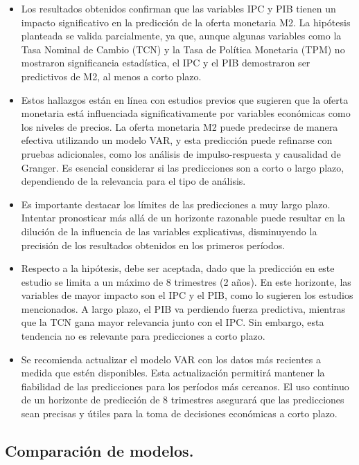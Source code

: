 \documentclass[
  12pt,
]{article}
\begin{document}
\begin{itemize}
\item
  Los resultados obtenidos confirman que las variables IPC y PIB tienen
  un impacto significativo en la predicción de la oferta monetaria M2.
  La hipótesis planteada se valida parcialmente, ya que, aunque algunas
  variables como la Tasa Nominal de Cambio (TCN) y la Tasa de Política
  Monetaria (TPM) no mostraron significancia estadística, el IPC y el
  PIB demostraron ser predictivos de M2, al menos a corto plazo.
\item
  Estos hallazgos están en línea con estudios previos que sugieren que
  la oferta monetaria está influenciada significativamente por variables
  económicas como los niveles de precios. La oferta monetaria M2 puede
  predecirse de manera efectiva utilizando un modelo VAR, y esta
  predicción puede refinarse con pruebas adicionales, como los análisis
  de impulso-respuesta y causalidad de Granger. Es esencial considerar
  si las predicciones son a corto o largo plazo, dependiendo de la
  relevancia para el tipo de análisis.
\item
  Es importante destacar los límites de las predicciones a muy largo
  plazo. Intentar pronosticar más allá de un horizonte razonable puede
  resultar en la dilución de la influencia de las variables
  explicativas, disminuyendo la precisión de los resultados obtenidos en
  los primeros períodos.
\item
  Respecto a la hipótesis, debe ser aceptada, dado que la predicción en
  este estudio se limita a un máximo de 8 trimestres (2 años). En este
  horizonte, las variables de mayor impacto son el IPC y el PIB, como lo
  sugieren los estudios mencionados. A largo plazo, el PIB va perdiendo
  fuerza predictiva, mientras que la TCN gana mayor relevancia junto con
  el IPC. Sin embargo, esta tendencia no es relevante para predicciones
  a corto plazo.
\item
  Se recomienda actualizar el modelo VAR con los datos más recientes a
  medida que estén disponibles. Esta actualización permitirá mantener la
  fiabilidad de las predicciones para los períodos más cercanos. El uso
  continuo de un horizonte de predicción de 8 trimestres asegurará que
  las predicciones sean precisas y útiles para la toma de decisiones
  económicas a corto plazo.
\end{itemize}

\subsection{Comparación de modelos.}\label{comparaciuxf3n-de-modelos.}
\end{document}
